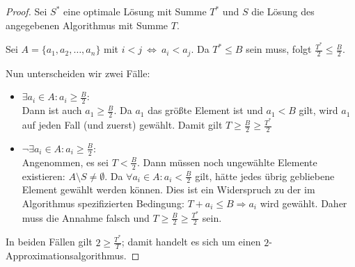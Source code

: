 \documentclass[a4paper]{scrartcl}
\newcommand{\approxalg}[1]{$#1$-Ap\-pro\-xi\-ma\-ti\-ons\-al\-go\-rith\-mus}
\newcommand{\gdw}{\ \Leftrightarrow\ }
\begin{document}
\begin{enumerate}[label=\bfseries \arabic*.]
\begin{enumerate}
\begin{proof}
            Sei $S^\ast$ eine optimale Lösung mit Summe $T^\ast$ und $S$ die
            Lösung des angegebenen Algorithmus mit Summe $T$.

            Sei $A = \{a_1, a_2, \dotsc, a_n\}$ mit $i < j \gdw a_i < a_j$.
            Da $T^\ast \leq B$ sein muss, folgt $\frac{T^\ast}{2} \leq \frac{B}{2}$.

            Nun unterscheiden wir zwei Fälle:
            \begin{itemize}
                \item $\exists a_i \in A : a_i \geq \frac{B}{2}$: \\
                    Dann ist auch $a_1 \geq \frac{B}{2}$. Da $a_1$ das größte
                    Element ist und $a_1 < B$ gilt, wird $a_1$ auf jeden Fall
                    (und zuerst) gewählt.
                    Damit gilt $T \geq \frac{B}{2} \geq \frac{T^\ast}{2}$
                \item $\lnot\exists a_i \in A : a_i \geq \frac{B}{2}$: \\
                    Angenommen, es sei $T < \frac{B}{2}$. Dann müssen noch
                    ungewählte Elemente existieren: $A \setminus S \neq \emptyset$.
                    Da $\forall a_i \in A : a_i < \frac{B}{2}$ gilt, hätte
                    jedes übrig gebliebene Element gewählt werden können.
                    Dies ist ein Widerspruch zu der im Algorithmus
                    spezifizierten Bedingung: $T + a_i \leq B \Rightarrow a_i$
                    wird gewählt.
                    Daher muss die Annahme falsch und
                    $T \geq \frac{B}{2} \geq \frac{T^\ast}{2}$ sein.
            \end{itemize}
            In beiden Fällen gilt $2 \geq \frac{T^\ast}{T}$; damit handelt es
            sich um einen \approxalg{2}.
        \end{proof}

\end{enumerate}


\end{enumerate}
\end{document}
